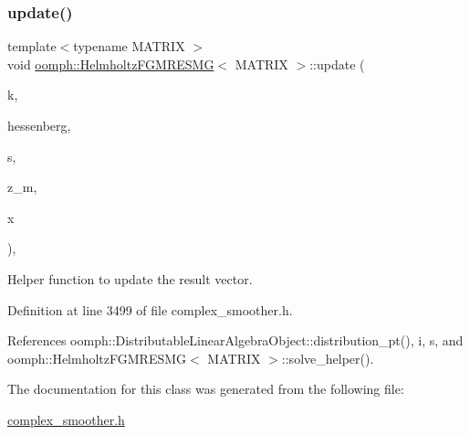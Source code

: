\subsubsection{\texorpdfstring{update()}{update()}}
{\footnotesize\ttfamily template$<$typename M\+A\+T\+R\+IX $>$ \\
void \hyperlink{classoomph_1_1HelmholtzFGMRESMG}{oomph\+::\+Helmholtz\+F\+G\+M\+R\+E\+S\+MG}$<$ M\+A\+T\+R\+IX $>$\+::update (\begin{DoxyParamCaption}\item[{const unsigned \&}]{k,  }\item[{const \hyperlink{classoomph_1_1Vector}{Vector}$<$ \hyperlink{classoomph_1_1Vector}{Vector}$<$ std\+::complex$<$ double $>$ $>$ $>$ \&}]{hessenberg,  }\item[{const \hyperlink{classoomph_1_1Vector}{Vector}$<$ std\+::complex$<$ double $>$ $>$ \&}]{s,  }\item[{const \hyperlink{classoomph_1_1Vector}{Vector}$<$ \hyperlink{classoomph_1_1Vector}{Vector}$<$ \hyperlink{classoomph_1_1DoubleVector}{Double\+Vector} $>$ $>$ \&}]{z\+\_\+m,  }\item[{\hyperlink{classoomph_1_1Vector}{Vector}$<$ \hyperlink{classoomph_1_1DoubleVector}{Double\+Vector} $>$ \&}]{x }\end{DoxyParamCaption})\hspace{0.3cm}{\ttfamily [inline]}, {\ttfamily [private]}}



Helper function to update the result vector. 



Definition at line 3499 of file complex\+\_\+smoother.\+h.



References oomph\+::\+Distributable\+Linear\+Algebra\+Object\+::distribution\+\_\+pt(), i, s, and oomph\+::\+Helmholtz\+F\+G\+M\+R\+E\+S\+M\+G$<$ M\+A\+T\+R\+I\+X $>$\+::solve\+\_\+helper().



The documentation for this class was generated from the following file\+:\begin{DoxyCompactItemize}
\item 
\hyperlink{complex__smoother_8h}{complex\+\_\+smoother.\+h}\end{DoxyCompactItemize}
